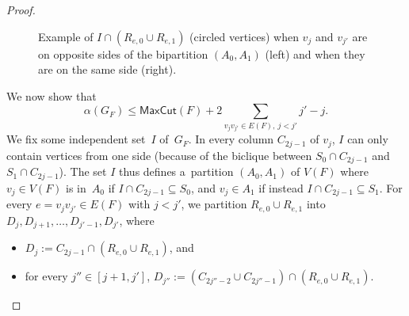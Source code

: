 \documentclass[a4paper,UKenglish,cleveref,autoref]{lipics-v2021}
\newcommand{\maxcut}{\mathsf{MaxCut}}
\begin{document}
\begin{proof}
\begin{claimproof}
\begin{figure}[!ht]
\caption{Example of $I\cap(R_{e,0}\cup R_{e,1})$ (circled vertices) when $v_j$ and $v_{j'}$ are on opposite sides of the bipartition $(A_0,A_1)$ (left) and when they are on the same side (right).}
\label{fig:alpha-lower-bound}
\end{figure}

    We now show that \[\alpha(G_F) \leqslant \maxcut(F) + 2 \sum\limits_{v_j v_{j'} \in E(F),~j<j'} j'-j.\]
    We fix some independent set~$I$ of~$G_F$.
    In every column $C_{2j-1}$ of $v_j$, $I$ can only contain vertices from one side (because of the biclique between $S_0 \cap C_{2j-1}$ and $S_1 \cap C_{2j-1}$).
    The set $I$ thus defines a~partition $(A_0,A_1)$ of $V(F)$ where $v_j \in V(F)$ is in~$A_0$ if $I \cap C_{2j-1} \subseteq S_0$, and $v_j \in A_1$ if instead $I \cap C_{2j-1} \subseteq S_1$.
    For every $e=v_jv_{j'} \in E(F)$ with $j<j'$, we partition $R_{e,0} \cup R_{e,1}$ into $D_j, D_{j+1}, \ldots, D_{j'-1}, D_{j'}$, where
    \begin{itemize}
    \item $D_j := C_{2j-1} \cap (R_{e,0} \cup R_{e,1})$, and
    \item for every $j'' \in [j+1,j']$, $D_{j''} := (C_{2j''-2} \cup C_{2j''-1}) \cap (R_{e,0} \cup R_{e,1})$.
    \end{itemize}


\end{claimproof}
\end{proof}
\end{document}
